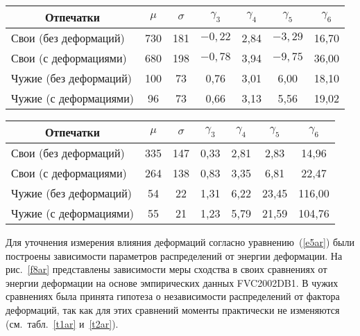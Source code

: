 \begin{multicols}{2}
\begin{table*}
\begin{center}
{}

\vspace*{2ex}

\begin{tabular}{|l|c|c|c|c|c|c|}
\hline
\multicolumn{1}{|c|}{Отпечатки}&$\mu $&$\sigma$&$\gamma_3$&$\gamma_4$&$\gamma_5$&$\gamma_6$\\
\hline
Свои (без деформаций)&730&181&$-0{,}22$&2,84&$-3{,}29$&16,70\\
Свои (с деформациями) &680&198&$-0{,}78$&3,94&$-9{,}75$&36,00\\
Чужие (без деформаций)&100&\hphantom{9}73&\hphantom{9,}0,76&3,01&\hphantom{9,}6,00&18,10\\
Чужие (с деформациями)&\hphantom{9}96&\hphantom{9}73&\hphantom{9,}0,66&3,13&\hphantom{9,}5,56&19,02\\
\hline
\end{tabular}
\end{center}
\end{table*}


\begin{table*}\small
\begin{center}
\parbox{105mm}{

}

\vspace*{2ex}

\tabcolsep=6.4pt
\begin{tabular}{|l|c|c|c|c|c|c|}
\hline
\multicolumn{1}{|c|}{Отпечатки}&$\mu$&$\sigma$&$\gamma_3$&$\gamma_4$&$\gamma_5$&$\gamma_6$\\
\hline
Свои (без деформаций)&335&147&0,33&2,81&\hphantom{9}2,83&\hphantom{9}14,96\\
Свои (с деформациями) &264&138&0,83&3,35&\hphantom{9}6,81&\hphantom{9}22,47\\
Чужие (без деформаций)&\hphantom{9}54&\hphantom{9}22&1,31&6,22&23,45&116,00\\
Чужие (с деформациями)&\hphantom{9}55&\hphantom{9}21&1,23&5,79&21,59&104,76\\
\hline
\end{tabular}
\end{center}
\end{table*}


  Для уточнения измерения влияния деформаций согласно уравнению~(\ref{e5ar}) были 
построены зависимости параметров распределений от энергии деформации. На рис.~\ref{f8ar} 
представлены зависимости меры сходства в своих сравнениях от энергии деформации на основе 
эмпирических данных FVC2002DB1. В чужих сравнениях была принята гипотеза о 
независимости распределений от фактора деформаций, так как для этих сравнений моменты 
практически не изменяются (см.\ табл.~\ref{t1ar} и~\ref{t2ar}).
  

\end{multicols}
